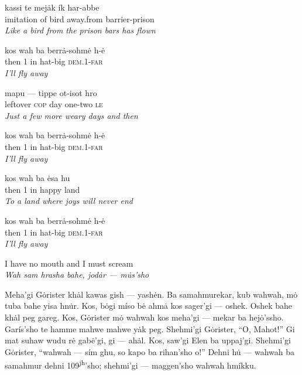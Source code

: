 \documentclass{article}[10pt]
\begin{document}
\begin{exe}
\ex
\gll kassi te mej\.{a}k \'{i}k har-abbe\\
imitation of bird away.from barrier-prison\\
\trans \emph{Like a bird from the prison bars has flown}

\ex
\gll kos wah ba berr\.{a}-sohm\.{e} h-\.{e}\\
then 1 in hat-big \textsc{dem.1}-\textsc{far}\\
\trans \emph{I'll fly away}

\ex
\gll mapu --- tippe ot-isot hro\\
leftover \textsc{cop} day one-two \textsc{le}\\
\trans \emph{Just a few more weary days and then}

\ex
\gll kos wah ba berr\.{a}-sohm\.{e} h-\.{e}\\
then 1 in hat-big \textsc{dem.1}-\textsc{far}\\
\trans \emph{I'll fly away}

\ex
\gll kos wah ba \.{e}sa hu\\
then 1 in happy land\\
\trans \emph{To a land where joys will never end}

\ex
\gll kos wah ba berr\.{a}-sohm\.{e} h-\.{e}\\
then 1 in hat-big \textsc{dem.1}-\textsc{far}\\
\trans \emph{I'll fly away}

\end{exe}
\clearpage

\begin{center}
I have no mouth and I must scream\\
\emph{Wah sam hrasha bahe, jod\.{a}r --- m\.{u}s'sho}\\
\end{center}

Meha'gi G\.{o}rister kh\.{a}l kawas gish --- yash\.{e}n. Ba samahmurekar, kub wahwah, m\.{o} tuba bahe yisa hn\.{u}r. Kos, b\.{o}gi m\'{i}so b\.{e} ahm\.{a} kos sager'gi --- oshek. Oshek bahe kh\.{a}l peg gareg. Kos, G\.{o}rister m\.{o} wahwah kos meha'gi --- mekar ba hej\.{o}'ssho. Gar\'{i}s'sho te hamme mahwe mahwe y\.{a}k peg. Shehmi'gi G\.{o}rister, ``O, Mahot!'' Gi mat suhaw wudu r\.{e} gab\.{e}'gi, gi --- ah\.{a}l. Kos, saw'gi Elen ba uppaj'gi. Shehmi'gi G\.{o}rister, ``wahwah --- s\'{i}m ghu, so kapo ba rihan'sho o!'' Dehni h\.{u} --- wahwah ba samahmur dehni 109\textsuperscript{jh}'sho; shehmi'gi --- maggen'sho wahwah hm\'{i}kku.\\
\end{document}
